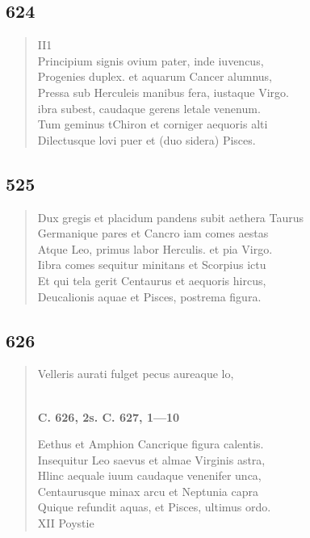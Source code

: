 \documentclass[11pt, a4paper]{report}
\begin{document}
            \subsection*{624}
      \begin{verse}
      II1 \\ Principium signis ovium pater, inde iuvencus, \\ Progenies duplex. et aquarum Cancer alumnus, \\ Pressa sub Herculeis manibus fera, iustaque Virgo. \\ ibra subest, caudaque gerens letale venenum. \\ Tum geminus tChiron et corniger aequoris alti \\ Dilectusque lovi puer et (duo sidera) Pisces. \\ 
      \end{verse}
  
            \subsection*{525}
      \begin{verse}
      Dux gregis et placidum pandens subit aethera Taurus \\ Germanique pares et Cancro iam comes aestas \\ Atque Leo, primus labor Herculis. et pia Virgo. \\ Iibra comes sequitur minitans et Scorpius ictu \\ Et qui tela gerit Centaurus et aequoris hircus, \\ Deucalionis aquae et Pisces, postrema figura. \\ 
      \end{verse}
  
            \subsection*{626}
      \begin{verse}
      Velleris aurati fulget pecus aureaque lo, \\ 
        ﻿\pagebreak 
    \begin{center} \textbf{C. 626, 2s. C. 627, 1—10} \end{center} \marginpar{[95]} Eethus et Amphion Cancrique figura calentis. \\ Insequitur Leo saevus et almae Virginis astra, \\ Hlinc aequale iuum caudaque venenifer unca, \\ Centaurusque minax arcu et Neptunia capra \\ Quique refundit aquas, et Pisces, ultimus ordo. \\ XII Poystie \rbrack  \\ 
      \end{verse}
  
\end{document}
